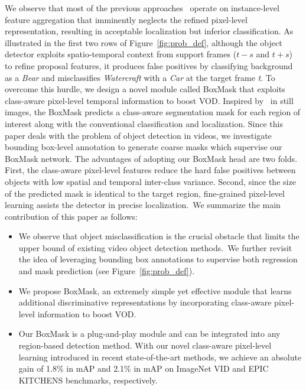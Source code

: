 \documentclass[10pt,twocolumn,letterpaper]{article}
\begin{document}
We observe that most of the previous approaches~\cite{zhu2017flow, wu2019sequence, gong2021temporal, chen2020memory} operate on instance-level feature aggregation that imminently neglects the refined pixel-level representation, resulting in acceptable localization but inferior classification. As illustrated in the first two rows of Figure~\ref{fig:prob_def}, although the object detector exploits spatio-temporal context from support frames (${t -s}$ and ${t + s}$) to refine proposal features, it produces false positives by classifying background as a \textit{Bear} and misclassifies \textit{Watercraft} with a \textit{Car} at the target frame \textit{t}. To overcome this hurdle, we design a novel module called BoxMask that exploits class-aware pixel-level temporal information to boost VOD. Inspired by~\cite{he2017mask} in still images, the BoxMask predicts a class-aware segmentation mask for each region of interest along with the conventional classification and localization. Since this paper deals with the problem of object detection in videos, we investigate bounding box-level annotation to generate coarse masks which supervise our BoxMask network. The advantages of adopting our BoxMask head are two folds. First, the class-aware pixel-level features reduce the hard false positives between objects with low spatial and temporal inter-class variance. Second, since the size of the predicted mask is identical to the target region, fine-grained pixel-level learning assists the detector in precise localization.~We summarize the main contribution of this paper as follows:
\vspace{-5pt}
\begin{itemize}
    \item We observe that object misclassification 
    is the crucial obstacle that limits the upper bound of existing video object detection methods.~We further revisit the idea of leveraging bounding box annotations to supervise both regression and mask prediction (see Figure~\ref{fig:prob_def}).
    \vspace{-5pt}
    \item We propose BoxMask, an extremely simple yet effective module that learns additional discriminative representations by incorporating class-aware pixel-level information to boost VOD.
    \vspace{-5pt}
    \item Our BoxMask is a plug-and-play module and can be integrated into any region-based detection method. With our novel class-aware pixel-level learning introduced in recent state-of-the-art methods, we achieve an absolute gain of 1.8\% in mAP and 2.1\% in mAP on ImageNet VID and EPIC KITCHENS benchmarks, respectively.

\end{itemize}
\end{document}
